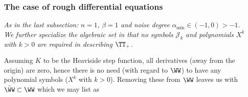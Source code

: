 \documentclass{article}
\begin{document}
%
%
%
%


\subsubsection{The case of rough differential equations} \label{subsubsec:RDEs}


{\it As in the last subsection: $n=1$, $\beta = 1$ and noise degree $\alpha_{\min} \in (-1,0) >-1$. We further specialize the algebraic set in that no symbols $\mathcal{J}_k$ and polynomials $X^k$ with $ k>0$ are required in describing $\TT_+$. }

\medskip

Assuming $K$ to be the Heaviside step function, all derivatives (away from the origin) are zero, hence there is no need (with regard to $\WW$)  to have any polynomial symbols ($X^k$ with $k > 0$). Removing these from $\WW$ leaves us with $\tilde \WW \subset \WW$ which we may list as
\end{document}
